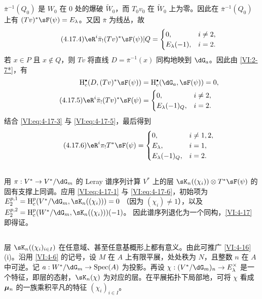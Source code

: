 $\bar\pi^{-1}(Q_0)$ 是 $W_0$ 在 $0$ 处的爆破 $\widetilde W_0$，而 $T_0v_0$ 在 $\widetilde W_0$ 上为零。因此在 $\bar\pi^{-1}(Q_0)$ 上有 $(Tv)^\ast\sF(\psi)=E_\lambda$。又因 $\bar\pi$ 为线丛，故
\begin{equation*}\tag{4.17.4}\label{VI:eq:4-17-4}
\eR^i\bar\pi_!(Tv)^\ast\sF(\psi)|Q=
\begin{cases}0,&i\ne2,\\E_\lambda(-1),&i=2.\end{cases}
\end{equation*}
若 $x\in P$ 且 $x\notin Q$，则 $Tv$ 将直线 $D=\bar\pi^{-1}(x)$ 同构地映到 $\dG_a$。因此由 \ref{VI:2-7*}，有
\begin{align}\notag
\h_c^\bullet(D,(Tv)^\ast\sF(\psi))&=\h_c^\bullet(\dG_a,\sF(\psi))=0,\\
\tag{4.17.5}\label{VI:eq:4-17-5}
\eR^i\bar\pi_!(Tv)^\ast\sF(\psi)&=
\begin{cases}0,&i\ne2,\\E_\lambda(-1)_Q,&i=2.\end{cases}
\end{align}
结合 \eqref{VI:eq:4-17-3} 与 \eqref{VI:eq:4-17-5}，最后得到
\begin{equation*}\tag{4.17.6}\label{VI:eq:4-17-6}
\eR^i\pi_!T^\ast\sF(\psi)=
\begin{cases}0,&i\ne1,2,\\E_\lambda,&i=1,\\E_\lambda(-1)_Q,&i=2.\end{cases}
\end{equation*}

\subsection{}\label{VI:4-18}
用 $\pi:V^\ast\to V^\ast/\dG_m$ 的 Leray 谱序列计算 $V^\ast$ 上的层
$\sK_n((\chi_i))\otimes T^\ast\sF(\psi)$ 的固有支撑上同调。应用 \eqref{VI:eq:4-17-1} 与 \eqref{VI:eq:4-17-6}，初始项为
$E_2^{p,1}=\h_c^p(V^\ast/\dG_m,\sK_n((\chi_i)))=0$
（因为 $(\chi_i)\ne1$），以及
$E_2^{p,2}=\h_c^p(W^\ast/\dG_m,\sK_n((\chi_i)))(-1)$。
因此谱序列退化为一个同构，\ref{VI:4-17} 即得证。

\subsection{}\label{VI:4-19}
层 $\sK_n((\chi_i)_{i\in I})$ 在任意域、甚至任意基概形上都有意义。由此可推广 \ref{VI:4-16}(i)。沿用 \ref{VI:4-6} 的记号，设 $M$ 在 $A$ 上有限平展，处处秩为 $N$，且整数 $n$ 在 $A$ 中可逆。记 $a:W^\ast/\dG_m\to\spec(A)$ 为投影。再设
$\chi:(V^\ast/\dG_m)_n\to E_\lambda^\times$
是一个特征，即层的态射，$\sK_n(\chi)$ 为对应的层。在平展拓扑下局部地，可将 $\chi$ 看成 ${\bm\mu}_n$ 的一族乘积平凡的特征 $(\chi_i)_{i\in I}$。

